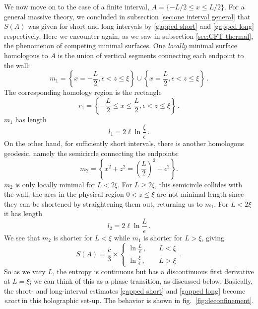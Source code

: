 \documentclass[11pt]{article}
\begin{document}
We now move on to the case of a finite interval, $A=\{-L/2\le x\le L/2\}$. For a general massive theory, we concluded in subsection \ref{sec:one interval general} that $S(A)$ was given for short and long intervals by \eqref{gapped short} and \eqref{gapped long} respectively. Here we encounter again, as we saw in subsection \ref{sec:CFT thermal}, the phenomenon of competing minimal surfaces. One \emph{locally} minimal surface homologous to $A$ is the union of vertical segments connecting each endpoint to the wall:
\begin{equation}
m_1 = \left\{x=-\frac L2, \epsilon<z\le\xi\right\} \cup \left\{x=\frac L2, \epsilon<z\le\xi\right\}\,.
\end{equation}
The corresponding homology region is the rectangle
\begin{equation}
r_1 = \left\{-\frac L2\le x\le \frac L2, \epsilon<z\le\xi\right\} \,.
\end{equation}
$m_1$ has length
\begin{equation}
l_1 = 2\ell\ln\frac\xi\epsilon\,.
\end{equation}
On the other hand, for sufficiently short intervals, there is another homologous geodesic, namely the semicircle connecting the endpoints:
\begin{equation}
m_2 =\left \{x^2+z^2 = \left(\frac L2\right)^2+\epsilon^2\right\}.
\end{equation}
$m_2$ is only locally minimal for $L<2\xi$. For $L\ge 2\xi$, this semicircle collides with the wall; the arcs in the physical region $0<z\le\xi$ are not minimal-length since they can be shortened by straightening them out, returning us to $m_1$. For $L<2\xi$ it has length
\begin{equation}
l_2 = 2\ell\ln\frac L\epsilon\,.
\end{equation}
We see that $m_2$ is shorter for $L<\xi$ while $m_1$ is shorter for $L>\xi$, giving
\begin{equation}\label{gapped holo}
S(A) = \frac c3\times\begin{cases}\ln\frac L\epsilon\,,\quad &L<\xi \\ \ln\frac\xi\epsilon\,,\quad & L>\xi\end{cases}\,.
\end{equation}
So as we vary $L$, the entropy is continuous but has a discontinuous first derivative at $L=\xi$; we can think of this as a phase transition, as discussed below. Basically, the short- and long-interval estimates \eqref{gapped short} and \eqref{gapped long} become \emph{exact} in this holographic set-up. The behavior is shown in fig.\ \ref{fig:deconfinement}.
\end{document}
